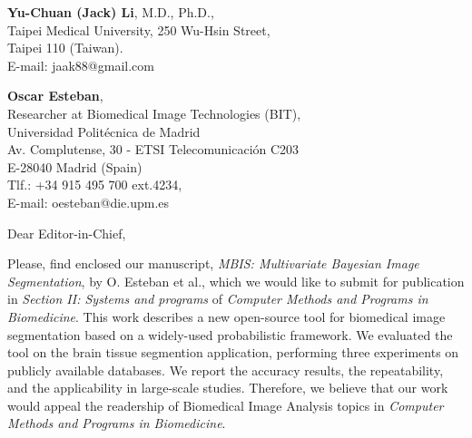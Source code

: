 \documentclass[11pt]{letter} %
\begin{document}

\begin{letter}{\textbf{Yu-Chuan (Jack) Li}, M.D., Ph.D., \\
Taipei Medical University, 250 Wu-Hsin Street, \\ 
Taipei 110 (Taiwan). \\ 
E-mail: jaak88@gmail.com
} 




\begin{flushright}
\textbf{Oscar Esteban}, \\ %
Researcher at Biomedical Image Technologies (BIT), \\ 
Universidad Polit\'ecnica de Madrid \\ 
Av. Complutense, 30 - ETSI Telecomunicaci\'on C203 \\
E-28040 Madrid (Spain) \\
Tlf.: +34 915 495 700 ext.4234,\\
E-mail: oesteban@die.upm.es %
\end{flushright} 
\vfill

\signature{Oscar Esteban} %


\opening{Dear Editor-in-Chief,}

Please, find enclosed our manuscript, \emph{MBIS: Multivariate Bayesian Image Segmentation}, by O. Esteban et al.,
which we would like to submit for publication in \emph{Section II: Systems and programs} of \emph{Computer Methods
and Programs in Biomedicine}. This work describes a new open-source tool for biomedical image segmentation based
on a widely-used probabilistic framework. We evaluated the tool on the brain tissue segmention application,
performing three experiments on publicly available databases. We report the accuracy results, the repeatability,
and the applicability in large-scale studies. Therefore, we believe that our work would appeal the readership of 
Biomedical Image Analysis topics in \emph{Computer Methods and Programs in Biomedicine}.


\end{letter}
\end{document}
